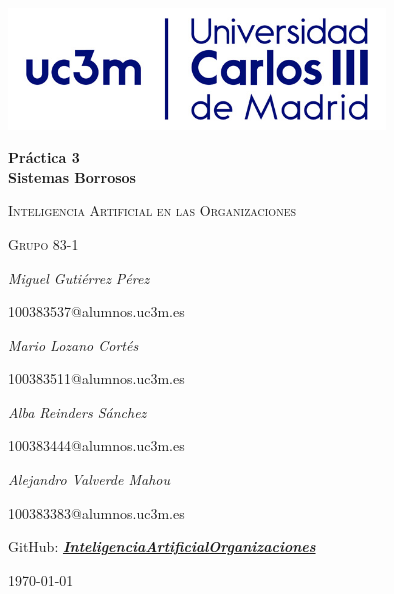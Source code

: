 \documentclass[12pt,a4paper, xcolor=table]{article}
\begin{document}
\setlength{\parindent}{0pt}
\begin{titlepage}
        \centering
        \includegraphics[width=0.75\textwidth]{img/logo_uc3m.jpg}\par\vspace{2cm}
        {\huge\bfseries Práctica 3 \\ Sistemas Borrosos\par}
        \vspace{0.5cm}
        {\scshape\Large Inteligencia Artificial en las Organizaciones\par}
        \vspace{1.5cm}
        {\scshape\Large Grupo 83-1\par}
        \vspace{1.5cm}
        {\Large\itshape Miguel Gutiérrez Pérez\par}
        {\Large 100383537@alumnos.uc3m.es \par}
        \vspace{1cm}
        {\Large\itshape Mario Lozano Cortés\par}
        {\Large 100383511@alumnos.uc3m.es\par}
        \vspace{1cm}
        {\Large\itshape Alba Reinders Sánchez\par}
        {\Large 100383444@alumnos.uc3m.es\par}
        \vspace{1cm}
        {\Large\itshape Alejandro Valverde Mahou\par}
        {\Large 100383383@alumnos.uc3m.es\par}
        \vspace{5mm}
        {\large GitHub: \textbf{\textit{\href{https://github.com/Pheithar/InteligenciaArtificialOrganizaciones}{InteligenciaArtificialOrganizaciones}}}}
        \vfill

        {\large \today\par}
\end{titlepage}

\tableofcontents

\newpage
\end{document}
